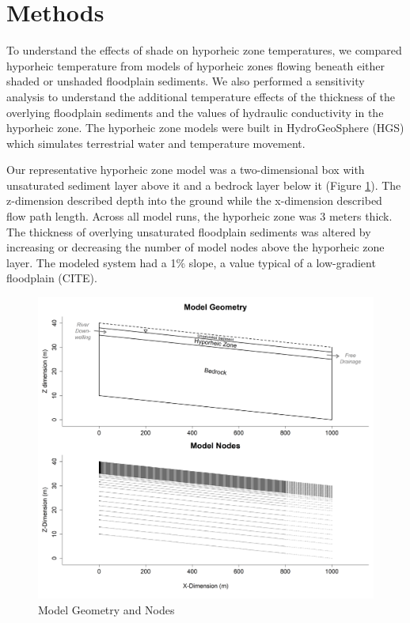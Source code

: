 \documentclass[letterpaper, 11pt]{article}
\begin{document}
\section{Methods}
To understand the effects of shade on hyporheic zone temperatures, we compared hyporheic temperature from models of hyporheic zones flowing beneath either shaded or unshaded floodplain sediments. We also performed a sensitivity analysis to understand the additional temperature effects of the thickness of the overlying floodplain sediments and the values of hydraulic conductivity in the hyporheic zone. The hyporheic zone models were built in HydroGeoSphere (HGS) \cite{Aquanity2015HGSManual} which simulates terrestrial water and temperature movement. 

Our representative hyporheic zone model was a two-dimensional box with unsaturated sediment layer above it and a bedrock layer below it (Figure \ref{fig:modelgeomgrid}). The z-dimension described depth into the ground while the x-dimension described flow path length. Across all model runs, the hyporheic zone was 3 meters thick. The thickness of overlying unsaturated floodplain sediments was altered by increasing or decreasing the number of model nodes above the hyporheic zone layer. The modeled system had a 1\% slope, a value typical of a low-gradient floodplain (CITE). 

\begin{figure}[!h]
\centering
\includegraphics[width = \textwidth]{Figures/ModelGeomAndGrid.png}
\caption{Model Geometry and Nodes}
\label{fig:modelgeomgrid}
\end{figure}
\end{document}

